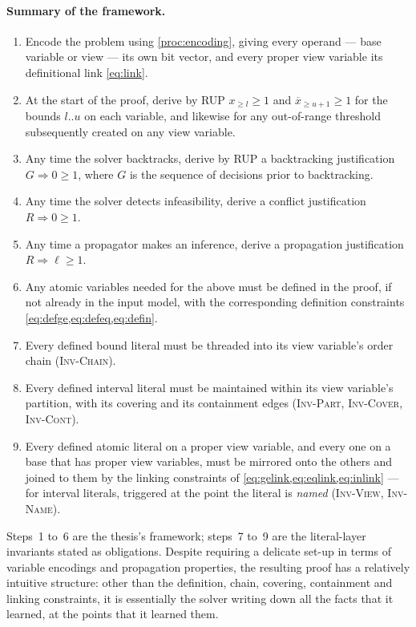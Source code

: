 \documentclass[11pt,a4paper]{article}
\theoremstyle{plain}
\theoremstyle{definition}
\theoremstyle{remark}
\newcommand{\atge}[2]{#1_{\geq #2}}
\newcommand{\natge}[2]{\overline{#1}_{\geq #2}}
\newcommand{\inv}[1]{\textnormal{\textsc{Inv-#1}}}
\newcommand{\invChain}{\inv{Chain}}
\newcommand{\invPart}{\inv{Part}}
\newcommand{\invCover}{\inv{Cover}}
\newcommand{\invCont}{\inv{Cont}}
\newcommand{\invView}{\inv{View}}
\newcommand{\invName}{\inv{Name}}
\begin{document}
\paragraph{Summary of the framework.}
\begin{enumerate}[itemsep=1pt]
  \item Encode the problem using \cref{proc:encoding}, giving every operand
    --- base variable or view --- its own bit vector, and every proper
    view variable its definitional link \cref{eq:link}.
  \item At the start of the proof, derive by RUP $\atge{x}{l}\geq 1$ and
    $\natge{x}{u+1}\geq 1$ for the bounds $l..u$ on each variable, and
    likewise for any out-of-range threshold subsequently created on any view variable.
  \item Any time the solver backtracks, derive by RUP a backtracking
    justification $G\Rightarrow 0\geq 1$, where $G$ is the sequence of decisions
    prior to backtracking.
  \item Any time the solver detects infeasibility, derive a conflict
    justification $R\Rightarrow 0\geq 1$.
  \item Any time a propagator makes an inference, derive a propagation
    justification $R\Rightarrow\ell\geq 1$.
  \item Any atomic variables needed for the above must be defined in the proof,
    if not already in the input model, with the corresponding definition
    constraints \cref{eq:defge,eq:defeq,eq:defin}.
  \item Every defined bound literal must be threaded into its view variable's
    order chain (\invChain{}).
  \item Every defined interval literal must be maintained within its
    view variable's partition, with its covering and its containment edges
    (\invPart{}, \invCover{}, \invCont{}).
  \item Every defined atomic literal on a proper view variable, and every one
    on a base that has proper view variables, must be mirrored onto the others
    and joined to them by the linking constraints of
    \cref{eq:gelink,eq:eqlink,eq:inlink} --- for interval literals, triggered at
    the point the literal is \emph{named} (\invView{}, \invName{}).
\end{enumerate}

Steps~1 to~6 are the thesis's framework; steps~7 to~9 are the literal-layer
invariants stated as obligations.  Despite requiring a delicate set-up in terms
of variable encodings and propagation properties, the resulting proof has a
relatively intuitive structure: other than the definition, chain, covering,
containment and linking constraints, it is essentially the solver writing down all
the facts that it learned, at the points that it learned them.
\end{document}

